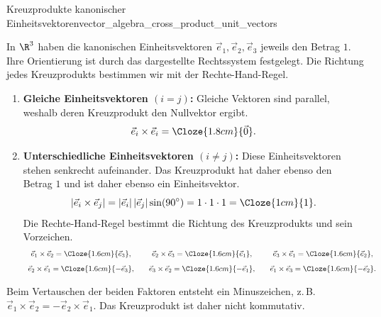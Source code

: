 \begin{ExampleBox}{Kreuzprodukte kanonischer Einheitsvektoren}{vector_algebra_cross_product_unit_vectors}
  \noindent
  \begin{minipage}[c]{0.57\linewidth}
    In $\R^3$ haben die kanonischen Einheitsvektoren
    $\vec e_1,\vec e_2,\vec e_3$ jeweils den Betrag $1$. Ihre Orientierung ist
    durch das dargestellte Rechtssystem festgelegt. Die Richtung jedes
    Kreuzprodukts bestimmen wir mit der Rechte-Hand-Regel.
  \end{minipage}\hfill
  \begin{minipage}[c]{0.39\linewidth}
    \centering
  \end{minipage}

  \begin{enumerate}[label=\alph*), leftmargin=*,itemsep=0.8em]
    \item \textbf{Gleiche Einheitsvektoren $(i=j)$:}
      Gleiche Vektoren sind parallel, weshalb deren Kreuzprodukt den Nullvektor ergibt.
      \[
        \vec e_i\times\vec e_i
        =\Cloze{1.8cm}{\vec 0}.
      \]

    \item \textbf{Unterschiedliche Einheitsvektoren $(i\ne j)$:}
      Diese Einheitsvektoren stehen senkrecht aufeinander. Das Kreuzprodukt hat daher
      ebenso den Betrag $1$ und ist daher ebenso ein Einheitsvektor.
      \[
        |\vec e_i\times\vec e_j|
        =|\vec e_i|\,|\vec e_j|\sin(90^\circ)
        =1\cdot1\cdot1
        =\Cloze{1cm}{1}.
      \]
      Die Rechte-Hand-Regel bestimmt die Richtung des Kreuzprodukts und sein
      Vorzeichen.
      \[
        \begin{array}{c@{\qquad}c@{\qquad}c}
          \vec e_1\times\vec e_2=\Cloze{1.6cm}{\vec e_3},
          &\vec e_2\times\vec e_3=\Cloze{1.6cm}{\vec e_1},
          &\vec e_3\times\vec e_1=\Cloze{1.6cm}{\vec e_2},\\[0.8em]
          \vec e_2\times\vec e_1=\Cloze{1.6cm}{-\vec e_3},
          &\vec e_3\times\vec e_2=\Cloze{1.6cm}{-\vec e_1},
          &\vec e_1\times\vec e_3=\Cloze{1.6cm}{-\vec e_2}.
        \end{array}
      \]
  \end{enumerate}
\end{ExampleBox}

Beim Vertauschen der beiden Faktoren entsteht ein Minuszeichen, z.\,B.
$\vec e_1\times\vec e_2=-\vec e_2\times\vec e_1$.
Das Kreuzprodukt ist daher nicht kommutativ.
